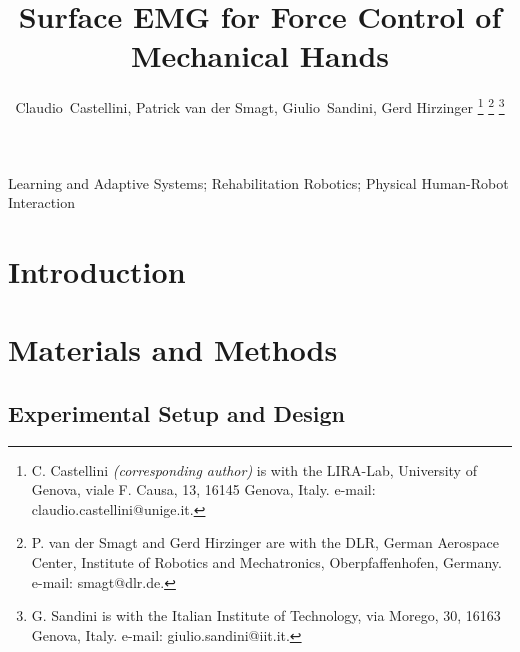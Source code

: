 \documentclass[conference,letterpaper]{IEEEtran}
\begin{document}

\title{Surface EMG for Force Control of\\Mechanical Hands}

\author{Claudio~Castellini, Patrick van der Smagt, Giulio~Sandini,
Gerd Hirzinger
\thanks{C. Castellini \emph{(corresponding author)}
  is with the LIRA-Lab, University of Genova,
  viale F. Causa, 13, 16145 Genova, Italy.
  e-mail: claudio.castellini@unige.it.}%
\thanks{P. van der Smagt and Gerd Hirzinger are with the DLR, German Aerospace Center,
  Institute of Robotics and Mechatronics, Oberpfaffenhofen, Germany.
  e-mail: smagt@dlr.de.}%
\thanks{G. Sandini is with the Italian Institute of Technology,
  via Morego, 30, 16163 Genova, Italy.
  e-mail: giulio.sandini@iit.it.}%
}

\maketitle

\begin{abstract}
  
\end{abstract}

\begin{IEEEkeywords}
Learning and Adaptive Systems; Rehabilitation Robotics; Physical
Human-Robot Interaction
\end{IEEEkeywords}

\IEEEpeerreviewmaketitle


\section{Introduction}
\label{sec:introduction}


\section{Materials and Methods}
\label{sec:m&ms}


\subsection{Experimental Setup and Design}
\label{subsec:setup}

\end{document}
